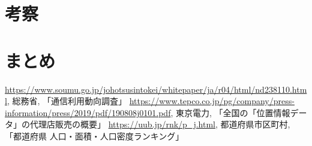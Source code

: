 \documentclass[a4paper, 9pt]{ltjsarticle}
\begin{document}
\section{考察}

\section{まとめ}

\begin{thebibliography}{9}
   \url{https://www.soumu.go.jp/johotsusintokei/whitepaper/ja/r04/html/nd238110.html}, 総務省, 「通信利用動向調査」 
   \url{https://www.tepco.co.jp/pg/company/press-information/press/2019/pdf/190808j0101.pdf}, 東京電力, 「全国の「位置情報データ」の代理店販売の概要」
   \url{https://uub.jp/rnk/p\_j.html}, 都道府県市区町村, 「都道府県 人口・面積・人口密度ランキング」
\end{thebibliography}
\end{document}
